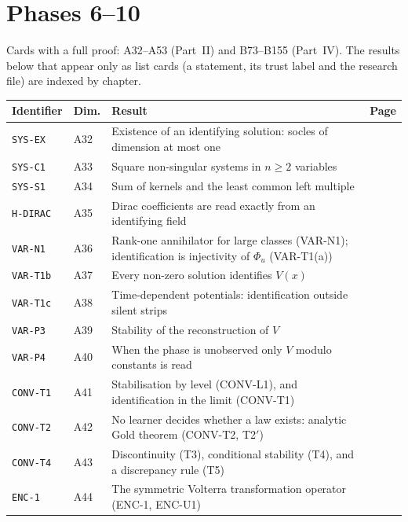 \documentclass[11pt,a4paper,oneside]{report}
\begin{document}
\section*{Phases 6--10}
Cards with a full proof: A32--A53 (Part~II) and B73--B155 (Part~IV). The results below that appear only as list cards (a statement, its trust label and the research file) are indexed by chapter.

\begin{center}\small
\begin{longtable}{@{}L{3.6cm}L{1.2cm}L{8.0cm}L{1.2cm}@{}}
\toprule
Identifier & Dim. & Result & Page\\ \midrule\endhead
\texttt{SYS-EX} & A32 & Existence of an identifying solution: socles of dimension at most one & \pageref{dim:SYS-EX}\\
\texttt{SYS-C1} & A33 & Square non-singular systems in $n\ge2$ variables & \pageref{dim:SYS-C1}\\
\texttt{SYS-S1} & A34 & Sum of kernels and the least common left multiple & \pageref{dim:SYS-S1}\\
\texttt{H-DIRAC} & A35 & Dirac coefficients are read exactly from an identifying field & \pageref{dim:H-DIRAC}\\
\texttt{VAR-N1} & A36 & Rank-one annihilator for large classes (VAR-N1); identification is injectivity of $\Phi_u$ (VAR-T1(a)) & \pageref{dim:VAR-N1}\\
\texttt{VAR-T1b} & A37 & Every non-zero solution identifies $V(x)$ & \pageref{dim:VAR-T1b}\\
\texttt{VAR-T1c} & A38 & Time-dependent potentials: identification outside silent strips & \pageref{dim:VAR-T1c}\\
\texttt{VAR-P3} & A39 & Stability of the reconstruction of $V$ & \pageref{dim:VAR-P3}\\
\texttt{VAR-P4} & A40 & When the phase is unobserved only $V$ modulo constants is read & \pageref{dim:VAR-P4}\\
\texttt{CONV-T1} & A41 & Stabilisation by level (CONV-L1), and identification in the limit (CONV-T1) & \pageref{dim:CONV-T1}\\
\texttt{CONV-T2} & A42 & No learner decides whether a law exists: analytic Gold theorem (CONV-T2, T2$'$) & \pageref{dim:CONV-T2}\\
\texttt{CONV-T4} & A43 & Discontinuity (T3), conditional stability (T4), and a discrepancy rule (T5) & \pageref{dim:CONV-T4}\\
\texttt{ENC-1} & A44 & The symmetric Volterra transformation operator (ENC-1, ENC-U1) & \pageref{dim:ENC-1}\\

\end{longtable}
\end{center}
\end{document}
